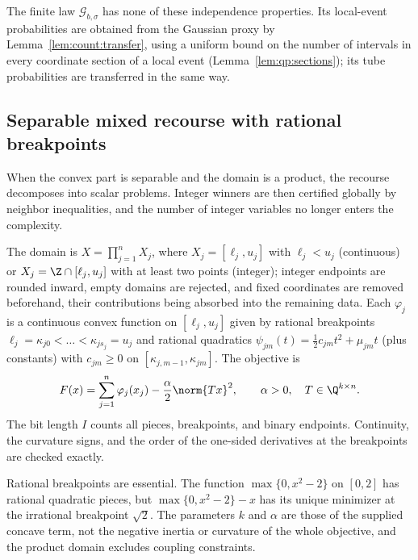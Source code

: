 The finite law $\mathcal G_{b,\sigma}$ has none of these independence
properties. Its local-event probabilities are obtained from the Gaussian
proxy by Lemma~\ref{lem:count:transfer}, using a uniform bound on the
number of intervals in every coordinate section of a local event
(Lemma~\ref{lem:qp:sections}); its tube probabilities are transferred in the
same way.

\subsection{Separable mixed recourse with rational breakpoints}\label{sec:qp:separable}

When the convex part is separable and the domain is a product, the recourse
decomposes into scalar problems. Integer winners are then certified globally
by neighbor inequalities, and the number of integer variables no longer
enters the complexity.

\begin{definition}\label{def:qp:sep}
The domain is $X=\prod_{j=1}^nX_j$, where $X_j=[\ell_j,u_j]$ with
$\ell_j<u_j$ (continuous) or $X_j=\Z\cap[\ell_j,u_j]$ with at least two
points (integer); integer endpoints are rounded inward, empty domains are
rejected, and fixed coordinates are removed beforehand, their contributions
being absorbed into the remaining data. Each $\varphi_j$ is a continuous
convex function on $[\ell_j,u_j]$ given by rational breakpoints
$\ell_j=\kappa_{j0}<\dots<\kappa_{js_j}=u_j$ and rational quadratics
$\psi_{jm}(t)=\frac12c_{jm}t^2+\mu_{jm}t$ (plus constants) with
$c_{jm}\ge0$ on $[\kappa_{j,m-1},\kappa_{jm}]$. The objective is
\[
 F(x)=\sum_{j=1}^n\varphi_j(x_j)-\frac\alpha2\norm{Tx}^2,
 \qquad\alpha>0,\quad T\in\Q^{k\times n}.
\]
The bit length $I$ counts all pieces, breakpoints, and binary endpoints.
Continuity, the curvature signs, and the order of the one-sided derivatives at
the breakpoints are checked exactly.
\end{definition}

Rational breakpoints are essential. The function $\max\{0,x^2-2\}$ on $[0,2]$
has rational quadratic pieces, but $\max\{0,x^2-2\}-x$ has its unique minimizer
at the irrational breakpoint $\sqrt2$. The parameters $k$ and $\alpha$ are
those of the supplied concave term, not the negative inertia or curvature of
the whole objective, and the product domain excludes coupling constraints.

